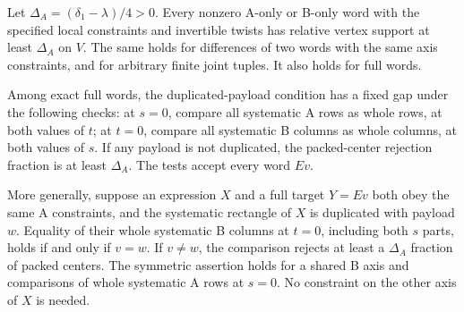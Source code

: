 \begin{lemma}\label{oc:one-axis}
Let $\Delta_A=(\delta_1-\lambda)/4>0$.  Every nonzero A-only or
B-only word with the specified local constraints and invertible twists
has relative vertex support at least $\Delta_A$ on $V$.  The same
holds for differences of two words with the same axis constraints,
and for arbitrary finite joint tuples.  It also holds for full words.

Among exact full words, the duplicated-payload condition has a fixed
gap under the following checks: at $s=0$, compare all systematic A
rows as whole rows, at both values of $t$; at $t=0$, compare all
systematic B columns as whole columns, at both values of $s$.
If any payload is not duplicated, the packed-center rejection
fraction is at least $\Delta_A$.  The tests accept every word $Ev$.

More generally, suppose an expression $X$ and a full target $Y=Ev$
both obey the same A constraints, and the systematic rectangle of
$X$ is duplicated with payload $w$.  Equality of their whole
systematic B columns at $t=0$, including both $s$ parts, holds if
and only if $v=w$.  If $v\ne w$, the comparison rejects at least a
$\Delta_A$ fraction of packed centers.  The symmetric assertion
holds for a shared B axis and comparisons of whole systematic A
rows at $s=0$.  No constraint on the other axis of $X$ is needed.
\end{lemma}

